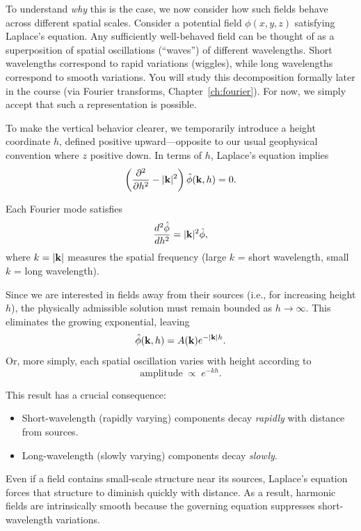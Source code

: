 To understand \emph{why} this is the case, we now consider how such fields behave across different spatial scales.  Consider a potential field $\phi(x,y,z)$ satisfying Laplace's equation.  Any sufficiently well-behaved field can be thought of as a superposition of spatial oscillations (``waves'') of different wavelengths. Short wavelengths correspond to rapid variations (wiggles), while long wavelengths correspond to smooth variations.  You will study this decomposition formally later in the course (via Fourier transforms, Chapter~\ref{ch:fourier}). For now, we simply accept that such a representation is possible.

To make the vertical behavior clearer, we temporarily introduce a height coordinate $h$, defined positive upward---opposite to our usual geophysical convention where $z$ positive down. In terms of $h$, Laplace's equation implies
\[
    \left( \pdv[2]{}{h} - |\vb{k}|^2 \right) \hat{\phi}(\vb{k}, h) = 0.
\]

Each Fourier mode satisfies
\[
    \frac{d^2 \hat{\phi}}{dh^2} = |\vb{k}|^2 \hat{\phi},
\]
where $k = |\vb{k}|$ measures the spatial frequency (large $k$ = short wavelength, small $k$ = long wavelength).

Since we are interested in fields away from their sources (i.e., for increasing height $h$), the physically admissible solution must remain bounded as $h \to \infty$. This eliminates the growing exponential, leaving
\[
    \hat{\phi}(\vb{k}, h) = A(\vb{k}) e^{-|\vb{k}| h}.
\]
Or, more simply, each spatial oscillation varies with height according to
\[
    \text{amplitude} \;\propto\; e^{-k h}.
\]

This result has a crucial consequence:
\begin{itemize}
    \item Short-wavelength (rapidly varying) components decay \emph{rapidly} with distance from sources.
    \item Long-wavelength (slowly varying) components decay \emph{slowly}.
\end{itemize}
Even if a field contains small-scale structure near its sources, Laplace's equation forces that structure to diminish quickly with distance.  As a result, harmonic fields are intrinsically smooth because the governing equation suppresses short-wavelength variations.

